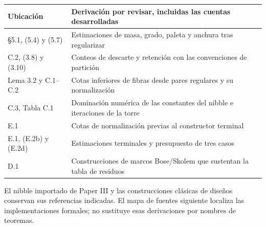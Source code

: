 \documentclass[spanish,11pt,a4paper]{article}
\newcounter{none}
\begin{document}

{\def\LTcaptype{none} %
\begin{longtable}[c]{@{}
  >{\raggedright\arraybackslash}p{}
  >{\raggedright\arraybackslash}p{}@{}}
\toprule\noalign{}
\begin{minipage}[b]{\linewidth}\raggedright
Ubicación
\end{minipage} & \begin{minipage}[b]{\linewidth}\raggedright
Derivación por revisar, incluidas las cuentas desarrolladas
\end{minipage} \\
\midrule\noalign{}
\endhead
\bottomrule\noalign{}
\endlastfoot
§5.1, (5.4) y (5.7) & Estimaciones de masa, grado, paleta y anchura tras regularizar \\
C.2, (3.8) y (3.10) & Conteos de descarte y retención con las convenciones de partición \\
Lema 3.2 y C.1--C.2 & Cotas inferiores de fibras desde pares regulares y su normalización \\
C.3, Tabla C.1 & Dominación numérica de las constantes del nibble e iteraciones de la torre \\
E.1 & Cotas de normalización previas al constructor terminal \\
E.1, (E.2b) y (E.2d) & Estimaciones terminales y presupuesto de tres casos \\
D.1 & Construcciones de marcos Bose/Skolem que sustentan la tabla de residuos \\
\end{longtable}
}

El nibble importado de Paper III y las construcciones clásicas de diseños conservan sus referencias indicadas. El mapa de fuentes siguiente localiza las implementaciones formales; no sustituye esas derivaciones por nombres de teoremas.
\end{document}
